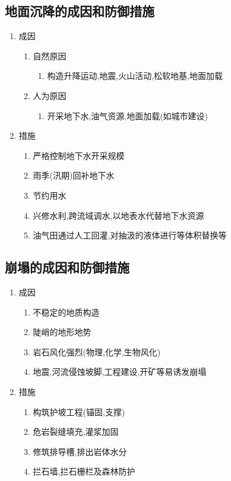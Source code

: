 \documentclass[a4paper]{article}
\begin{document}
    \subsection{地面沉降的成因和防御措施}
    \begin{enumerate}
        \item 成因
        \begin{enumerate}
            \item 自然原因
            \begin{enumerate}
                \item 构造升降运动,地震,火山活动,松软地基,地面加载
            \end{enumerate}
            \item 人为原因
            \begin{enumerate}
                \item 开采地下水,油气资源,地面加载(如城市建设)
            \end{enumerate}
        \end{enumerate}
        \item 措施
        \begin{enumerate}
            \item 严格控制地下水开采规模
            \item 雨季(汛期)回补地下水
            \item 节约用水
            \item 兴修水利,跨流域调水,以地表水代替地下水资源
            \item 油气田通过人工回灌,对抽汲的液体进行等体积替换等
        \end{enumerate}
    \end{enumerate}
    \subsection{崩塌的成因和防御措施}
    \begin{enumerate}
        \item 成因
        \begin{enumerate}
            \item 不稳定的地质构造
            \item 陡峭的地形地势
            \item 岩石风化强烈(物理,化学,生物风化)
            \item 地震,河流侵蚀坡脚,工程建设,开矿等易诱发崩塌
        \end{enumerate}
        \item 措施
        \begin{enumerate}
            \item 构筑护坡工程(锚固,支撑)
            \item 危岩裂缝填充,灌浆加固
            \item 修筑排导槽,排出岩体水分
            \item 拦石墙,拦石栅栏及森林防护
        \end{enumerate}
    \end{enumerate}
\end{document}
